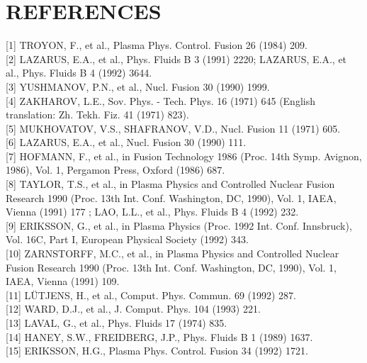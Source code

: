 \documentclass[utf8]{ctexart}
\begin{document}
\begin{sloppypar}
 \section{REFERENCES}
\textcolor{green!50!black}{[1]} TROYON, F., et al., Plasma Phys. Control. Fusion 26 (1984) 209.\\[0pt]
\textcolor{green!50!black}{[2]} LAZARUS, E.A., et al., Phys. Fluids B 3 (1991) 2220; LAZARUS, E.A., et al., Phys. Fluids B 4 (1992) 3644.\\[0pt]
\textcolor{green!50!black}{[3]} YUSHMANOV, P.N., et al., Nucl. Fusion 30 (1990) 1999.\\[0pt]
\textcolor{green!50!black}{[4]} ZAKHAROV, L.E., Sov. Phys. - Tech. Phys. 16 (1971) 645 (English translation: Zh. Tekh. Fiz. 41 (1971) 823).\\[0pt]
\textcolor{green!50!black}{[5]} MUKHOVATOV, V.S., SHAFRANOV, V.D., Nucl. Fusion 11 (1971) 605.\\[0pt]
\textcolor{green!50!black}{[6]} LAZARUS, E.A., et al., Nucl. Fusion 30 (1990) 111.\\[0pt]
\textcolor{green!50!black}{[7]} HOFMANN, F., et al., in Fusion Technology 1986 (Proc. 14th Symp. Avignon, 1986), Vol. 1, Pergamon Press, Oxford (1986) 687.\\[0pt]
\textcolor{green!50!black}{[8]} TAYLOR, T.S., et al., in Plasma Physics and Controlled Nuclear Fusion Research 1990 (Proc. 13th Int. Conf. Washington, DC, 1990), Vol. 1, IAEA, Vienna (1991) 177 ; LAO, L.L., et al., Phys. Fluids B 4 (1992) 232.\\[0pt]
\textcolor{green!50!black}{[9]} ERIKSSON, G., et al., in Plasma Physics (Proc. 1992 Int. Conf. Innsbruck), Vol. 16C, Part I, European Physical Society (1992) 343.\\[0pt]
\textcolor{green!50!black}{[10]} ZARNSTORFF, M.C., et al., in Plasma Physics and Controlled Nuclear Fusion Research 1990 (Proc. 13th Int. Conf. Washington, DC, 1990), Vol. 1, IAEA, Vienna (1991) 109.\\[0pt]
\textcolor{green!50!black}{[11]} LÜTJENS, H., et al., Comput. Phys. Commun. 69 (1992) 287.\\[0pt]
\textcolor{green!50!black}{[12]} WARD, D.J., et al., J. Comput. Phys. 104 (1993) 221.\\[0pt]
\textcolor{green!50!black}{[13]} LAVAL, G., et al., Phys. Fluids 17 (1974) 835.\\[0pt]
\textcolor{green!50!black}{[14]} HANEY, S.W., FREIDBERG, J.P., Phys. Fluids B 1 (1989) 1637.\\[0pt]
\textcolor{green!50!black}{[15]} ERIKSSON, H.G., Plasma Phys. Control. Fusion 34 (1992) 1721.\\[0pt]

\end{sloppypar}
\end{document}
